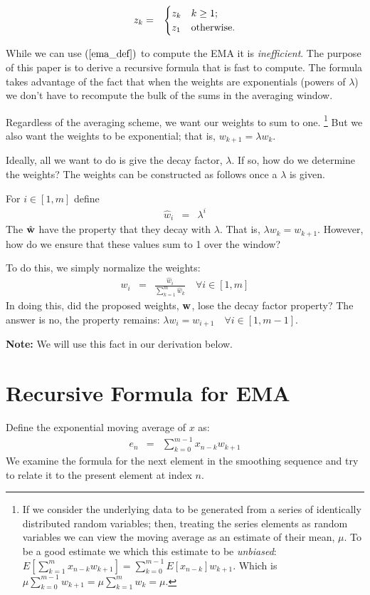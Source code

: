 \documentclass{article}
\begin{document}
\begin{eqnarray}
 z_{k} & = & \begin{cases}
     z_{k} & k \ge 1; \cr
     z_1 & \text{otherwise}. \cr
    \end{cases}
\end{eqnarray}

While we can use $(\ref{ema_def})$ to compute the EMA it is {\em inefficient\/}. 
The purpose of this
paper is to derive a recursive formula that is fast to compute.
The formula takes advantage of the fact that when the weights are exponentials
(powers of $\lambda$) we don't have to recompute the bulk of the sums in the 
averaging window.

Regardless of the averaging scheme, we want our weights to sum to one.%
\footnote{If we consider the underlying data to be generated from a series of identically distributed random
variables; then, treating the series elements as random variables we can view 
the moving average as an estimate of their mean, $\mu$. 
To be a good estimate we which this estimate to be {\em unbiased\/}:
$E\left[\sum_{k=1}^m x_{n-k} w_{k+1}\right] = \sum_{k=0}^{m-1} E[x_{n-k}]w_{k+1}$.
Which is $\mu \sum_{k=0}^{m-1} w_{k+1} = \mu \sum_{k=1}^{m} w_k = \mu$.}
But we also want the weights to be exponential; that is, $w_{k+1} = \lambda w_{k}$.

Ideally, all we want to do is give the decay factor, $\lambda$. If so, 
how do we determine the weights?
The weights can be constructed as follows once a $\lambda$ is given.

For $i \in [1, m]$ define
\begin{eqnarray}
    {\hat w}_i & = & \lambda^i 
\end{eqnarray}
The ${\hat {\bf w}}$ have the property that they decay with $\lambda$.
That is, $\lambda w_{k} = w_{k+1}$. However, how do we ensure that
these values sum to 1 over the window? 

To do this, we simply normalize the weights:
\begin{eqnarray}
w_i & = &  \frac{{\hat w}_i}{\sum_{k=1}^m {\hat w}_k} \quad \forall i \in [1, m]
\end{eqnarray}
In doing this, did the proposed weights, ${\bf w}$, lose the decay factor
property? The answer is no, the property remains: $\lambda w_{i} = w_{i+1} \quad \forall i \in [1, m-1]$.

{\bf Note:\/} We will use this fact in our derivation below.

\section{Recursive Formula for EMA}
Define the exponential moving average of $x$ as:
\begin{eqnarray}
e_n & = & \sum_{k=0}^{m-1} x_{n-k} w_{k+1}
\end{eqnarray}
We examine the formula for the next element in the smoothing sequence 
and try to relate it to the present element at index $n$.
\end{document}
